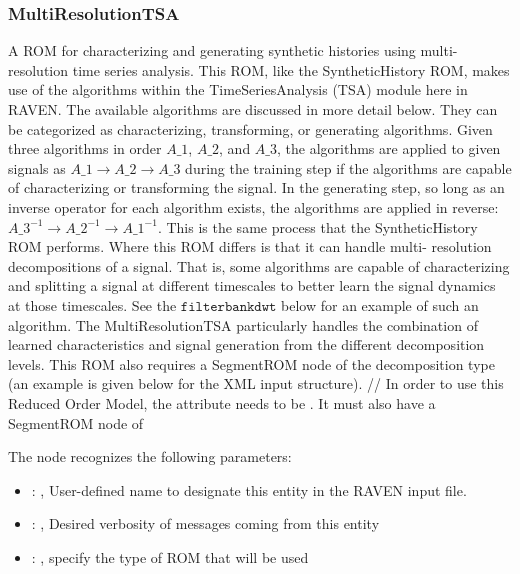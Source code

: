 \subsubsection{MultiResolutionTSA}
  A ROM for characterizing and generating synthetic histories using multi-resolution time
  series analysis. This ROM, like the SyntheticHistory ROM, makes use of the algorithms within the
  TimeSeriesAnalysis (TSA)       module here in RAVEN. The available algorithms are discussed in
  more detail below. They can be categorized as       characterizing, transforming, or generating
  algorithms. Given three algorithms in order $A\_1$, $A\_2$, and $A\_3$, the       algorithms are
  applied to given signals as $A\_1 \rightarrow A\_2 \rightarrow A\_3$ during the training step if the
  algorithms are capable of characterizing or transforming the signal. In the generating step, so
  long as an inverse       operator for each algorithm exists, the algorithms are applied in
  reverse: $A\_3^{-1} \rightarrow A\_2^{-1} \rightarrow A\_1^{-1}$.       This is the same process that
  the SyntheticHistory ROM performs. Where this ROM differs is that it can handle       multi-
  resolution decompositions of a signal. That is, some algorithms are capable of characterizing and
  splitting       a signal at different timescales to better learn the signal dynamics at those
  timescales. See the $\texttt{filterbankdwt}$       below for an example of such an algorithm. The
  MultiResolutionTSA particularly handles the combination of learned       characteristics and
  signal generation from the different decomposition levels. This ROM also requires a SegmentROM
  node of the decomposition type (an example is given below for the XML input structure).       //
  In order to use this Reduced Order Model, the  attribute  needs to
  be       . It must also have a SegmentROM node of 

  The  node recognizes the following parameters:
    \begin{itemize}
      \item {}: , 
        User-defined name to designate this entity in the RAVEN input file.
      \item {}: , 
        Desired verbosity of messages coming from this entity
      \item {}: , 
        specify the type of ROM that will be used
  \end{itemize}

